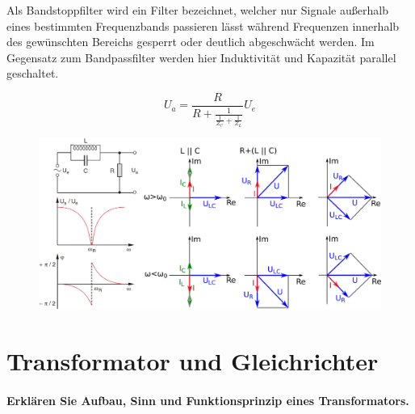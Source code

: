 \documentclass[a4paper, 11pt, ngerman, parskip=half-]{scrartcl}
\newcommand{\myparagraph}[1]{\paragraph{#1}\mbox{}\\}
\begin{document}
Als Bandstoppfilter wird ein Filter bezeichnet, welcher nur Signale außerhalb eines bestimmten
Frequenzbands passieren lässt während Frequenzen innerhalb des gewünschten Bereichs gesperrt oder
deutlich abgeschwächt werden. Im Gegensatz zum Bandpassfilter werden hier Induktivität und
Kapazität parallel geschaltet.

\begin{equation}
    U_a = \frac{R}{R + \frac{1}{\frac{1}{Z_C} + \frac{1}{Z_L}}} U_e
\end{equation}
\begin{figure}[H]
    \centering
    \includegraphics[width=12cm]{image/10/6}
\end{figure}

\newpage

\section{Transformator und Gleichrichter}

\myparagraph{Erklären Sie Aufbau, Sinn und Funktionsprinzip eines Transformators.}
\end{document}
